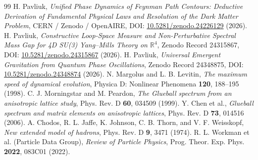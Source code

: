 \documentclass[11pt,a4paper]{article}
\begin{document}
\begin{thebibliography}{99}
 H. Pavliuk, \emph{Unified Phase Dynamics of Feynman Path Contours: Deductive Derivation of Fundamental Physical Laws and Resolution of the Dark Matter Problem}, CERN / Zenodo / OpenAIRE, DOI: \href{https://doi.org/10.5281/zenodo.24226129}{10.5281/zenodo.24226129} (2026).
 H. Pavliuk, \emph{Constructive Loop-Space Measure and Non-Perturbative Spectral Mass Gap for 4D SU(3) Yang--Mills Theory on $\mathbb{R}^4$}, Zenodo Record 24315867, DOI: \href{https://doi.org/10.5281/zenodo.24315867}{10.5281/zenodo.24315867} (2026).
 H. Pavliuk, \emph{Universal Emergent Gravitation from Quantum Phase Oscillations}, Zenodo Record 24348875, DOI: \href{https://doi.org/10.5281/zenodo.24348874}{10.5281/zenodo.24348874} (2026).
 N. Margolus and L. B. Levitin, \emph{The maximum speed of dynamical evolution}, Physica D: Nonlinear Phenomena \textbf{120}, 188--195 (1998).
 C. J. Morningstar and M. Peardon, \emph{The Glueball spectrum from an anisotropic lattice study}, Phys. Rev. D \textbf{60}, 034509 (1999).
 Y. Chen et al., \emph{Glueball spectrum and matrix elements on anisotropic lattices}, Phys. Rev. D \textbf{73}, 014516 (2006).
 A. Chodos, R. L. Jaffe, K. Johnson, C. B. Thorn, and V. F. Weisskopf, \emph{New extended model of hadrons}, Phys. Rev. D \textbf{9}, 3471 (1974).
 R. L. Workman et al. (Particle Data Group), \emph{Review of Particle Physics}, Prog. Theor. Exp. Phys. \textbf{2022}, 083C01 (2022).
\end{thebibliography}
\end{document}
